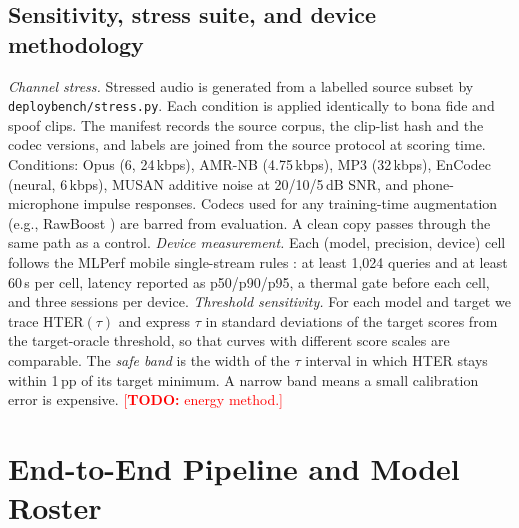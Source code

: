 \documentclass[journal]{IEEEtran}
\newcommand{\todo}[1]{\textcolor{red}{[\textbf{TODO:} #1]}}
\begin{document}
\subsection{Sensitivity, stress suite, and device methodology}
\emph{Channel stress.} Stressed audio is generated from a labelled source
subset by \texttt{deploybench/stress.py}. Each condition is applied
identically to bona fide and spoof clips. The manifest records the source
corpus, the clip-list hash and the codec versions, and labels are joined from
the source protocol at scoring time. Conditions: Opus (6, 24\,kbps), AMR-NB
(4.75\,kbps), MP3 (32\,kbps), EnCodec \cite{defossez23_encodec} (neural, 6\,kbps), MUSAN additive noise
at 20/10/5\,dB SNR, and phone-microphone impulse responses. Codecs used for any
training-time augmentation (e.g., RawBoost \cite{tak22_rawboost}) are barred from evaluation. A clean copy passes
through the same path as a control.
\emph{Device measurement.} Each (model, precision, device) cell follows the
MLPerf mobile single-stream rules \cite{reddi22_mlperf_mobile}: at least 1,024
queries and at least 60\,s per cell, latency reported as p50/p90/p95, a thermal
gate before each cell, and three sessions per device.
\emph{Threshold sensitivity.} For each model and target we trace HTER\((\tau)\)
and express \(\tau\) in standard deviations of the target scores from the
target-oracle threshold, so that curves with different score scales are
comparable. The \emph{safe band} is the width of the \(\tau\) interval in which
HTER stays within 1\,pp of its target minimum. A narrow band means a small
calibration error is expensive. \todo{energy method.}

\section{End-to-End Pipeline and Model Roster}
\label{sec:pipeline}
\end{document}

